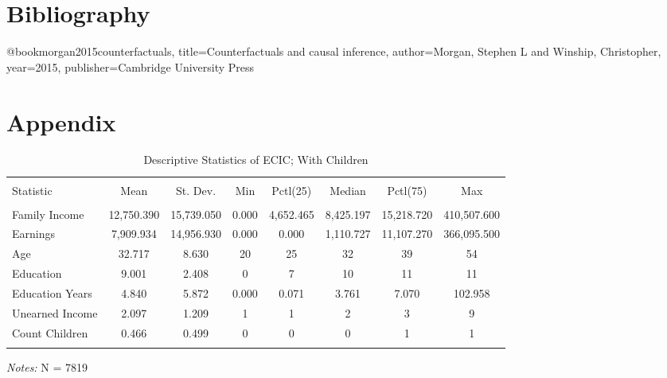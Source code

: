 \documentclass[a4paper]{article}
\begin{document}
\section{Bibliography}
\begin{thebibliography}{9}

@book{morgan2015counterfactuals,
  title={Counterfactuals and causal inference},
  author={Morgan, Stephen L and Winship, Christopher},
  year={2015},
  publisher={Cambridge University Press}
}


\end{thebibliography}

\section{Appendix}


\begin{table}[!htbp] 
\begin{adjustwidth}{-0cm}{-0cm}
\begin{threeparttable}
\small
\captionsetup{font=small, justification=raggedright,singlelinecheck=false}
  \caption{Descriptive Statistics of ECIC; With Children} 
  \label{} 
\begin{tabular}{@{\extracolsep{5pt}}lccccccc} 
\\[-1.8ex]\hline 
\hline \\[-1.8ex] 
Statistic & \multicolumn{1}{c}{Mean} & \multicolumn{1}{c}{St. Dev.} & \multicolumn{1}{c}{Min} & \multicolumn{1}{c}{Pctl(25)} & \multicolumn{1}{c}{Median} & \multicolumn{1}{c}{Pctl(75)} & \multicolumn{1}{c}{Max} \\ 
\hline \\[-1.8ex] 
Family Income & 12,750.390 & 15,739.050 & 0.000 & 4,652.465 & 8,425.197 & 15,218.720 & 410,507.600 \\ 
Earnings & 7,909.934 & 14,956.930 & 0.000 & 0.000 & 1,110.727 & 11,107.270 & 366,095.500 \\ 
Age & 32.717 & 8.630 & 20 & 25 & 32 & 39 & 54 \\ 
Education & 9.001 & 2.408 & 0 & 7 & 10 & 11 & 11 \\ 
Education Years & 4.840 & 5.872 & 0.000 & 0.071 & 3.761 & 7.070 & 102.958 \\ 
Unearned Income & 2.097 & 1.209 & 1 & 1 & 2 & 3 & 9 \\ 
Count Children & 0.466 & 0.499 & 0 & 0 & 0 & 1 & 1 \\ 
\hline \\[-1.8ex] 
\end{tabular} 
\begin{tablenotes}
      \small
      \item\textit{Notes:} N = 7819
    \end{tablenotes}
\end{threeparttable}
\end{adjustwidth}
\end{table} 
\end{document}
